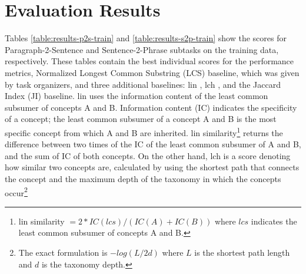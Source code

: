 \documentclass[11pt]{article}
\begin{document}
\section{Evaluation Results}
\label{evaluation}
Tables \ref{table:results-p2s-train} and \ref{table:results-s2p-train} show the scores for Paragraph-2-Sentence and Sentence-2-Phrase subtasks on the training data, respectively. These tables contain the best individual scores for the performance metrics, Normalized Longest Common Substring (LCS) baseline, which was given by task organizers, and three additional baselines: lin \cite{lin1998information}, lch \cite{leacock1998combining}, and the Jaccard Index (JI) baseline. lin uses the information content \cite{resnik1995inforcontent} of the least common subsumer  of concepts A and B. Information content (IC) indicates the specificity of a concept; the least common subsumer of a concept A and B is the most specific concept from which A and B are inherited. lin similarity\footnote{lin similarity $=  2 * IC(lcs) / (IC(A) + IC(B))$ where $lcs$ indicates the least common subsumer of concepts A and B.} returns the difference between two times of the IC of the least common subsumer of A and B, and the sum of IC of both 
concepts. On the other hand, lch is a score denoting how similar two concepts are, calculated by using the shortest path that connects the concept and the maximum depth of the taxonomy in which the concepts occur\footnote{The exact formulation is $-log(L/2d)$ where $L$ is the shortest path length and $d$ is the taxonomy depth.} 
\begin{table}[hl]
\begin{center}
\end{center}
\caption{\label{table:results-p2s} Paragraph-2-Sentence subtask scores for the test data. \emph{Best} indicates the best correlation score for the subtask. LCS stands for Normalized Longest Common Substring. Subscripts in AI-KU systems specify the run number.}
\end{table}
\end{document}
